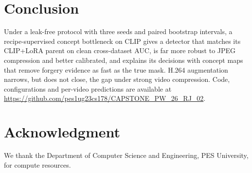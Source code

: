 \documentclass[conference]{IEEEtran}
\begin{document}
\section{Conclusion}
Under a leak-free protocol with three seeds and paired bootstrap intervals, a recipe-supervised concept bottleneck
on CLIP gives a detector that matches its CLIP+LoRA parent on clean cross-dataset AUC, is far more robust to JPEG
compression and better calibrated, and explains its decisions with concept maps that remove forgery evidence as fast
as the true mask. H.264 augmentation narrows, but does not close, the gap under strong video compression. Code,
configurations and per-video predictions are available at \url{https://github.com/pes1ug23cs178/CAPSTONE_PW_26_RJ_02}.

\section*{Acknowledgment}
We thank the Department of Computer Science and Engineering, PES University, for compute resources.


\end{document}
